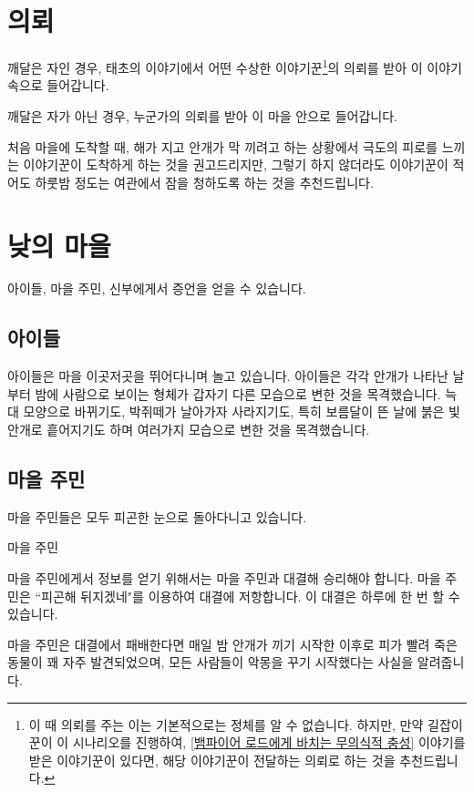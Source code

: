\documentclass{report}
\begin{document}
	\section{의뢰}
	깨달은 자인 경우, 태초의 이야기에서 어떤 수상한 이야기꾼\footnote{\label{who-is-it}이 때 의뢰를 주는 이는 기본적으로는 정체를 알 수 없습니다. 하지만, 만약 길잡이꾼이 이 시나리오를 진행하여, \hyperlink{vamp-master}{[뱀파이어 로드에게 바치는 무의식적 충성]} 이야기를 받은 이야기꾼이 있다면, 해당 이야기꾼이 전달하는 의뢰로 하는 것을 추천드립니다.}의 의뢰를 받아 이 이야기 속으로 들어갑니다. 
	
	깨달은 자가 아닌 경우, 누군가의 의뢰를 받아 이 마을 안으로 들어갑니다.
	
	처음 마을에 도착할 때, 해가 지고 안개가 막 끼려고 하는 상황에서 극도의 피로를 느끼는 이야기꾼이 도착하게 하는 것을 권고드리지만, 그렇기 하지 않더라도 이야기꾼이 적어도 하룻밤 정도는 여관에서 잠을 청하도록 하는 것을 추천드립니다.
	
	\section{낮의 마을}
	아이들, 마을 주민, 신부에게서 증언을 얻을 수 있습니다.
	
	\subsection{아이들}
	아이들은 마을 이곳저곳을 뛰어다니며 놀고 있습니다. 아이들은 각각 안개가 나타난 날 부터 밤에 사람으로 보이는 형체가 갑자기 다른 모습으로 변한 것을 목격했습니다. 늑대 모양으로 바뀌기도, 박쥐떼가 날아가자 사라지기도, 특히 보름달이 뜬 날에 붉은 빛 안개로 흩어지기도 하며 여러가지 모습으로 변한 것을 목격했습니다.
	
	\subsection{마을 주민}
	마을 주민들은 모두 피곤한 눈으로 돌아다니고 있습니다.
	
	\begin{spoil}{마을 주민}
		\subject{수면 부족}
		
	\end{spoil}
	
	마을 주민에게서 정보를 얻기 위해서는 마을 주민과 대결해 승리해야 합니다. 마을 주민은 ``피곤해 뒤지겠네"를 이용하여 대결에 저항합니다. 이 대결은 하루에 한 번 할 수 있습니다.
	
	마을 주민은 대결에서 패배한다면 매일 밤 안개가 끼기 시작한 이후로 피가 빨려 죽은 동물이 꽤 자주 발견되었으며, 모든 사람들이 악몽을 꾸기 시작했다는 사실을 알려줍니다.
	
\end{document}
